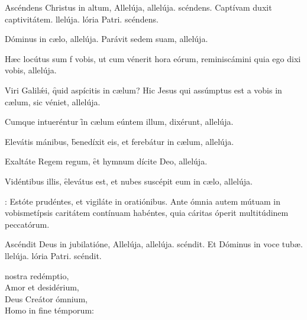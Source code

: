 \documentclass[fontsize=9pt,paper=A6,twoside,BCOR=1mm,DIV=22,headinclude]{scrarticle}
\begin{document}


\begin{multicols}{2}




\Rbr Ascéndens Christus in altum, \red{*} Allelúja, allelúja.
scéndens.
\V Captívam duxit captivitátem.
llelúja.
lória Patri.
scéndens.


\V Dóminus in cælo, allelúja.
\R Parávit sedem suam, allelúja.

\M Hæc locútus sum f vobis, ut cum vénerit hora eórum, reminiscámini quia ego dixi vobis, allelúja.



\etper
{} Viri Galilǽi, \f quid aspícitis in cælum? Hic Jesus qui assúmptus est a vobis in cælum, sic véniet, allelúja.
\Dominusregnavit

 Cumque intueréntur \f in cælum eúntem illum, dixérunt, allelúja.

 Elevátis mánibus, \f benedíxit eis, et ferebátur in cælum, allelúja.

 Exaltáte Regem regum, \f et hymnum dícite Deo, allelúja.

 Vidéntibus illis, \f elevátus est, et nubes suscépit eum in cælo, allelúja.

: Estóte prudéntes, et vigiláte in oratiónibus. Ante ómnia autem mútuam in vobismetípsis caritátem contínuam habéntes, quia cáritas óperit multitúdinem peccatórum.

\Rbr Ascéndit Deus in jubilatióne, \red{*} Allelúja, allelúja.
scéndit. \V Et Dóminus in voce tubæ. llelúja. lória Patri. scéndit.

\begin{hymnus}
 nostra redémptio,\\
\hspace{1.6em} Amor et desidérium,\\
Deus Creátor ómnium,\\
Homo in fine témporum:


\end{hymnus}
\end{multicols}
\end{document}
